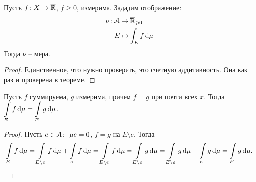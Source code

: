 \begin{corollary}
    Пусть $f \colon X \to \overline{\mathbb{R}}$, $f \geqslant 0$, измерима. Зададим отображение:
    \begin{align*}
        \nu \colon &\mathcal{A} \to \overline{\mathbb{R}}_{\geqslant 0} \\ 
                   &E \mapsto \int_E{f \,\mathrm{d}\mu}
    \end{align*}
    Тогда $\nu$ -- мера.
\end{corollary}
\begin{proof}
    Единственное, что нужно проверить, это счетную аддитивность. Она как раз и проверена в теореме.
\end{proof}

\begin{lemma}
    Пусть $f$ суммируема, $g$ измерима, причем $f = g$ при почти всех $x$. Тогда
    $\displaystyle \int\limits_E{f \,\mathrm{d}\mu} = \int\limits_E{g \,\mathrm{d}\mu}$.
\end{lemma}
\begin{proof}
    Пусть $e \in \mathcal{A}\colon~ \mu{e} = 0$, $f = g$ на $E \setminus e$. Тогда
\[
    \int\limits_{E}{f \,\mathrm{d}\mu} = \int\limits_{E \setminus e}{f \,\mathrm{d}\mu} + \int\limits_{e}{f \,\mathrm{d}\mu}
    = \int\limits_{E \setminus e}{f \,\mathrm{d}\mu} = \int\limits_{E \setminus e}{g \,\mathrm{d}\mu}
    = \int\limits_{E \setminus e}{g \,\mathrm{d}\mu} + \int\limits_e{g \,\mathrm{d}\mu} = \int\limits_{E}{g \,\mathrm{d}\mu}
.\]
\end{proof}

